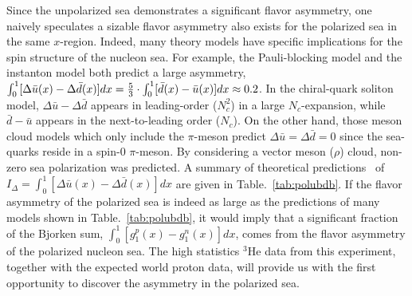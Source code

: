 
 Since the unpolarized sea demonstrates a significant flavor asymmetry, 
 one naively speculates a sizable flavor asymmetry also exists for 
 the polarized sea in the same $x$-region.
 Indeed, many theory models have specific 
 implications for the spin structure of the nucleon sea. 
For example, the Pauli-blocking model and 
 the instanton model both predict a large asymmetry, 
 $\int_0^1 [\Delta \bar{u}(x)-\Delta \bar{d}(x)]dx={5 \over 3} \cdot \int_0^1 [\bar{d}(x)-\bar{u}(x)]dx \approx 0.2$.
 In the chiral-quark soliton model, $\Delta \bar{u}-\Delta \bar{d}$ appears in leading-order ($N_c^2$) in a large 
$N_c$-expansion, while $\bar{d}-\bar{u}$ appears in the next-to-leading order ($N_c$). 
 On the other hand, those meson cloud models which only include the $\pi$-meson 
predict $\Delta \bar{u}=\Delta \bar{d}=0$ 
 since the sea-quarks reside in a spin-0 $\pi$-meson. By considering a vector meson ($\rho$) cloud, non-zero sea 
 polarization 
 was predicted.
A summary of theoretical
predictions~\cite{jcpengpol} of $I_\Delta = \int_0^1 [\Delta \bar{u}(x)-\Delta \bar{d}(x)]dx$ are given in Table.~\ref{tab:polubdb}. If the
 flavor asymmetry of the polarized sea is indeed as large as the predictions of many models 
shown in Table.~\ref{tab:polubdb}, it would imply that a significant fraction of the Bjorken
sum, $\int_0^1[g_1^p(x)-g_1^n(x)]dx$, comes from the flavor asymmetry of the polarized nucleon sea.
The high statistics $^3$He data from this experiment, together with the expected world proton data, 
will provide us with the first opportunity to discover the asymmetry in the polarized sea.
